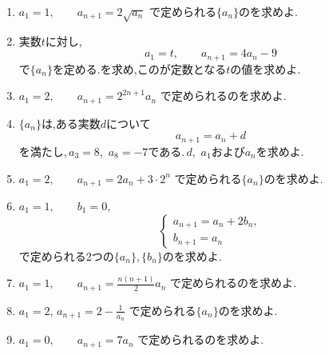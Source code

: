 \begin{enumerate}[label=\textbf{問\arabic*.},leftmargin=3.8em,format=\bookitemlink{practice-basic}{problem}{answer}]
                                で定められる2つの$\{a_n\},\{b_n\}$のを求めよ.
          \item $\displaystyle a_1=1,\qquad a_{n+1}=2\sqrt{a_n}$
                で定められる$\{a_n\}$のを求めよ.
          \item 実数$t$に対し,
                \[
                  a_1=t,\qquad a_{n+1}=4a_n-9
                \]
                で$\{a_n\}$を定める.を求め,このが定数となる$t$の値を求めよ.
          \item $\displaystyle a_1=2,\qquad a_{n+1}=2^{2n+1}a_n$
                で定められるのを求めよ.
          \item {}$\{a_n\}$は,ある実数$d$について
                \[
                  a_{n+1}=a_n+d
                \]
                を満たし,\,$a_3=8$,\, $a_8=-7$である.\,$d$,\, $a_1$および$a_n$を求めよ.
          \item $\displaystyle a_1=2,\qquad a_{n+1}=2a_n+3\cdot2^n$
                で定められる$\{a_n\}$のを求めよ.
          \item $\displaystyle a_1=1,\qquad b_1=0,$
                            \[
                              \begin{cases}
                                a_{n+1}=a_n+2b_n,\\
                                b_{n+1}=a_n
                              \end{cases}
                            \]
                                で定められる2つの$\{a_n\},\{b_n\}$のを求めよ.
          \item $\displaystyle a_1=1,\qquad a_{n+1}=\frac{n(n+1)}2a_n$
                で定められるのを求めよ.
          \item $\displaystyle a_1=2,\,a_{n+1}=2-\frac1{a_n}$
                で定められる$\{a_n\}$のを求めよ.
          \item $\displaystyle a_1=0,\qquad a_{n+1}=7a_n$
                で定められるのを求めよ.

\end{enumerate}
